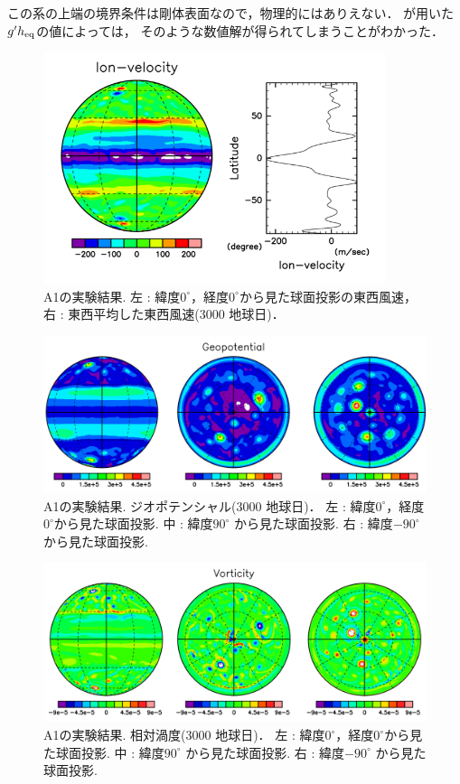 \documentclass[a4j,12pt,openbib,oneside]{jreport}
\begin{document}
この系の上端の境界条件は剛体表面なので，物理的にはありえない．
\cite{Showman2007} が用いた$g'h_{\rm{eq}}$の値によっては，
そのような数値解が得られてしまうことがわかった．
%
\begin{figure}[b]
  \begin{center}
    \includegraphics[clip,width=10cm]{./fig/result/A1/A1_1.png}
    \caption{
      \footnotesize{A1の実験結果. 左 : 緯度$0^\circ$，経度$0^\circ$から見た球面投影の東西風速，右 : 東西平均した東西風速(3000 地球日)．
      }
    }
    \label{fig:A1_1}
  \end{center}
\end{figure}
%
\begin{figure}[ht]
  \begin{center}
    \includegraphics[clip,width=12cm]{./fig/result/A1/A1_2.png}
    \caption{
      \footnotesize{A1の実験結果. ジオポテンシャル(3000 地球日)．
左 : 緯度$0^\circ$，経度$0^\circ$から見た球面投影.
中 : 緯度$90^\circ$ から見た球面投影.
右 : 緯度$-90^\circ$ から見た球面投影.
      }
    }
    \label{fig:A1_2}
  \end{center}
\end{figure}
%
\begin{figure}[ht]
  \begin{center}
    \includegraphics[clip,width=12cm]{./fig/result/A1/A1_3.png}
    \caption{
      \footnotesize{A1の実験結果. 相対渦度(3000 地球日)．
左 : 緯度$0^\circ$，経度$0^\circ$から見た球面投影.
中 : 緯度$90^\circ$ から見た球面投影.
右 : 緯度$-90^\circ$ から見た球面投影.
      }
    }
    \label{fig:A1_3}
  \end{center}
\end{figure}
\end{document}
